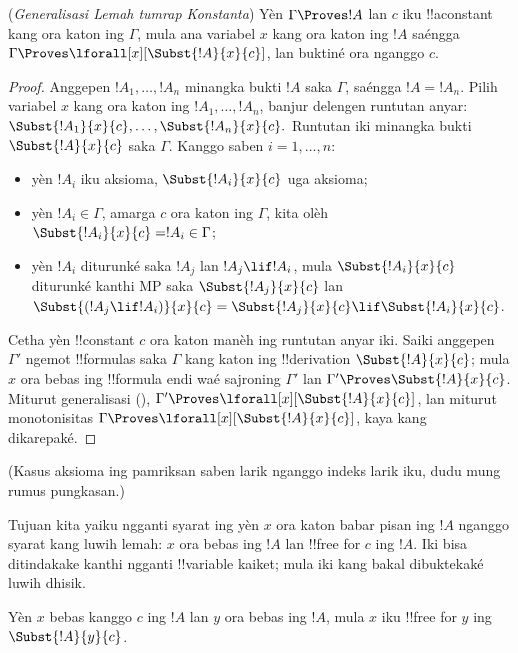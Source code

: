 \documentclass[../../../include/open-logic-section]{subfiles}
\begin{document}
\begin{thm} (\emph{Generalisasi Lemah tumrap Konstanta})
Yèn $\Gamma \Proves !A$ lan $c$ iku !!a{constant} kang ora
katon ing $\Gamma$, mula ana variabel $x$ kang ora katon
ing $!A$ saéngga $\Gamma
\Proves \lforall[x][\Subst{!A}{x}{c}]$, lan buktiné ora nganggo $c$.
\end{thm}

\begin{proof} Anggepen $!A_1,\ldots,!A_n$ minangka bukti $!A$ saka
$\Gamma$, saéngga $!A=!A_n$. Pilih variabel $x$ kang ora katon
ing $!A_1,\ldots,!A_n$, banjur delengen runtutan anyar:
$\Subst{!A_1}{x}{c},\ldots,\Subst{!A_n}{x}{c}.$ Runtutan iki
minangka bukti $\Subst{!A}{x}{c}$ saka $\Gamma$. Kanggo saben
$i=1,\ldots,n$: \begin{itemize} \item yèn $!A_i$ iku aksioma,
$\Subst{!A_i}{x}{c}$ uga aksioma; \item yèn $!A_i \in \Gamma$,
amarga $c$ ora katon ing $\Gamma$, kita olèh
$\Subst{!A_i}{x}{c} = !A_i \in \Gamma$; \item yèn $!A_i$
diturunké saka $!A_j$ lan $!A_j \lif !A_i$, mula
$\Subst{!A_i}{x}{c}$ diturunké kanthi MP saka
$\Subst{!A_j}{x}{c}$ lan $\Subst{(!A_j \lif !A_i)}{x}{c}
= \Subst{!A_j}{x}{c} \lif \Subst{!A_i}{x}{c}$.
\end{itemize} Cetha yèn !!{constant} $c$ ora katon manèh
ing runtutan anyar iki. Saiki anggepen $\Gamma'$ ngemot !!{formula}s
saka $\Gamma$ kang katon ing !!{derivation}
$\Subst{!A}{x}{c}$; mula $x$ ora bebas ing !!{formula} endi waé
sajroning $\Gamma'$ lan $\Gamma' \Proves \Subst{!A}{x}{c}$.
Miturut generalisasi (), $\Gamma'
\Proves \lforall[x][\Subst{!A}{x}{c}]$, lan miturut
monotonisitas $\Gamma \Proves
\lforall[x][\Subst{!A}{x}{c}]$, kaya kang dikarepaké.
\end{proof}
(Kasus aksioma ing pamriksan saben larik nganggo indeks larik iku, dudu mung rumus pungkasan.)

\begin{explain}
Tujuan kita yaiku ngganti syarat ing  yèn $x$
ora katon babar pisan ing $!A$ nganggo syarat kang luwih lemah:
$x$ ora bebas ing $!A$ lan !!{free for} $c$ ing $!A$.
Iki bisa ditindakake kanthi ngganti !!{variable} kaiket;
mula iki kang bakal dibuktekaké luwih dhisik.
\end{explain}

\begin{lem}
Yèn $x$ bebas kanggo $c$ ing $!A$ lan $y$ ora bebas ing $!A$,
mula $x$ iku !!{free for} $y$ ing $\Subst{!A}{y}{c}$.
\end{lem}
\end{document}
